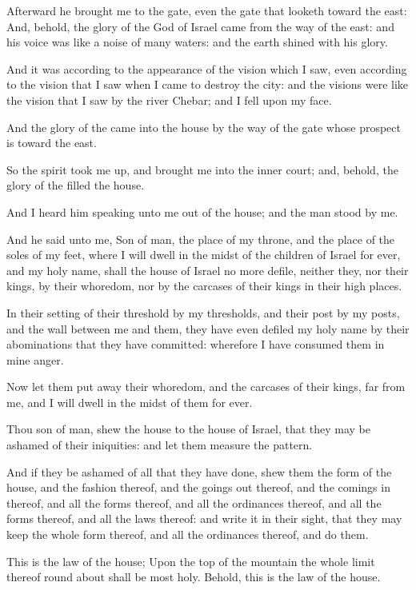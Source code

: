 \Chapter
\Verse Afterward he brought me to the gate, even the gate that looketh toward the east: \Verse And, behold, the glory of the God of Israel came from the way of the east: and his voice was like a noise of many waters: and the earth shined with his glory.

\Verse And it was according to the appearance of the vision which I saw, even according to the vision that I saw when I came to destroy the city: and the visions were like the vision that I saw by the river Chebar; and I fell upon my face.

\Verse And the glory of the \LORD came into the house by the way of the gate whose prospect is toward the east.

\Verse So the spirit took me up, and brought me into the inner court; and, behold, the glory of the \LORD filled the house.

\Verse And I heard him speaking unto me out of the house; and the man stood by me.

\Verse And he said unto me, Son of man, the place of my throne, and the place of the soles of my feet, where I will dwell in the midst of the children of Israel for ever, and my holy name, shall the house of Israel no more defile, neither they, nor their kings, by their whoredom, nor by the carcases of their kings in their high places.

\Verse In their setting of their threshold by my thresholds, and their post by my posts, and the wall between me and them, they have even defiled my holy name by their abominations that they have committed: wherefore I have consumed them in mine anger.

\Verse Now let them put away their whoredom, and the carcases of their kings, far from me, and I will dwell in the midst of them for ever.

\Verse Thou son of man, shew the house to the house of Israel, that they may be ashamed of their iniquities: and let them measure the pattern.

\Verse And if they be ashamed of all that they have done, shew them the form of the house, and the fashion thereof, and the goings out thereof, and the comings in thereof, and all the forms thereof, and all the ordinances thereof, and all the forms thereof, and all the laws thereof: and write it in their sight, that they may keep the whole form thereof, and all the ordinances thereof, and do them.

\Verse This is the law of the house; Upon the top of the mountain the whole limit thereof round about shall be most holy. Behold, this is the law of the house.

